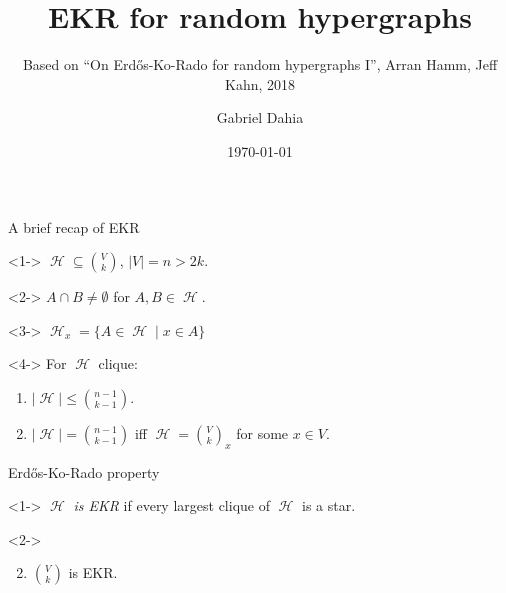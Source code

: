 \documentclass{beamer}
\title{EKR for random hypergraphs}
\subtitle{Based on ``On Erd\H{o}s-Ko-Rado for random hypergraphs I'', Arran Hamm, Jeff
  Kahn, 2018}
\author{Gabriel Dahia}
\institute{IMPA}
\date{\today}
\DeclareMathOperator{\Hy}{\mathcal{H}}
\newcommand{\V}[1]{{V \choose #1}}
\begin{document}
\beamertemplatenavigationsymbolsempty

\begin{frame}
  \titlepage
\end{frame}

\begin{frame}{A brief recap of EKR}
  \begin{definition}<1->
    $\Hy \subseteq \V{k}$, $|V| = n > 2k$.
  \end{definition}

  \begin{definition}<2->
    $A \cap B \neq \emptyset$ for $A, B \in \Hy$.
  \end{definition}

  \begin{definition}[Star]<3->
    $\Hy_x = \{A \in \Hy \mid x \in A\}$
  \end{definition}

  \begin{theorem}<4->
    For $\Hy$ clique:
    \begin{enumerate}
      \item $|\Hy| \le {n - 1 \choose k - 1}$.
      \item<5-> $|\Hy| = {n - 1 \choose k - 1}$ iff $\Hy =
              \V{k}_x$ for some $x \in V$.
    \end{enumerate}
  \end{theorem}

\end{frame}

\begin{frame}{Erd\H{o}s-Ko-Rado property}

  \begin{definition}<1->
    $\Hy$ \emph{is EKR} if every largest clique of $\Hy$ is a star.
  \end{definition}

  \begin{theorem}<2->
    \begin{enumerate}
      \setcounter{enumi}{1}
      \item $\V{k}$ is EKR.
    \end{enumerate}
  \end{theorem}

\end{frame}
\end{document}
